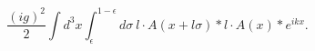\begin{equation}
  \frac{(ig)^2}{2} \int d^3 x
  \int_\epsilon^{1-\epsilon} d \sigma~
  l \cdot A (x + l \sigma) \ast l \cdot A(x) \ast e^{ikx}.
\end{equation}

